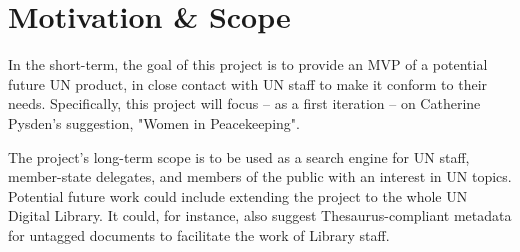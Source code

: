 
\section{Motivation \& Scope} \label{sec:motivation-scope}

In the short-term, the goal of this project is to provide an MVP of a potential future UN product, in close contact with UN staff to make it conform to their needs. Specifically, this project will focus – as a first iteration – on Catherine Pysden's suggestion, "Women in Peacekeeping".

The project's long-term scope is to be used as a search engine for UN staff, member-state delegates, and members of the public with an interest in UN topics. Potential future work could include extending the project to the whole UN Digital Library. It could, for instance, also suggest Thesaurus-compliant metadata for untagged documents to facilitate the work of Library staff.